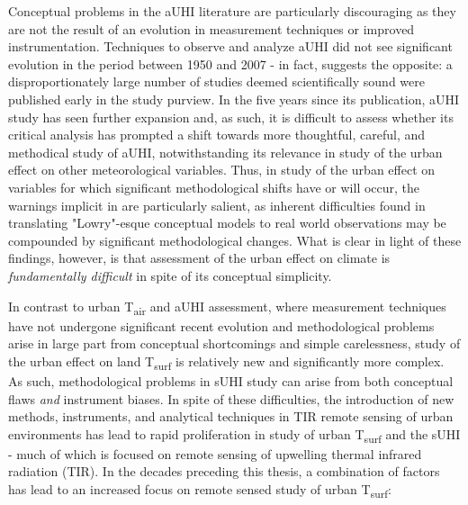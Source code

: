 \begin{bibunit}
Conceptual problems in the aUHI literature are particularly discouraging as they are not the result of an evolution in measurement techniques or improved instrumentation. Techniques to observe and analyze aUHI did not see significant evolution in the period between 1950 and 2007 - in fact, \citet{Stewart2011} suggests the opposite: a disproportionately large number of studies deemed scientifically sound were published early in the study purview. In the five years since its publication, aUHI study has seen further expansion and, as such, it is difficult to assess whether its critical analysis has prompted a shift towards more thoughtful, careful, and methodical study of aUHI, notwithstanding its relevance in study of the urban effect on other meteorological variables. Thus, in study of the urban effect on variables for which significant methodological shifts have or will occur, the warnings implicit in \citet{Stewart2011} are particularly salient, as inherent difficulties found in translating "Lowry"-esque conceptual models to real world observations may be compounded by significant methodological changes. What is clear in light of these findings, however, is that assessment of the urban effect on climate is \textit{fundamentally difficult} in spite of its conceptual simplicity. 


In contrast to urban T\textsubscript{air} and aUHI assessment, where measurement techniques have not undergone significant recent evolution and methodological problems arise in large part from conceptual shortcomings and simple carelessness, study of the urban effect on land T\textsubscript{surf} is relatively new and significantly more complex. As such, methodological problems in sUHI study can arise from both conceptual flaws \textit{and} instrument biases. In spite of these difficulties, the introduction of new methods, instruments, and analytical techniques in TIR remote sensing of urban environments has lead to rapid proliferation in study of urban T\textsubscript{surf} and the sUHI - much of which is focused on remote sensing of upwelling thermal infrared radiation (TIR). In the decades preceding this thesis, a combination of factors has lead to an increased focus on remote sensed study of urban T\textsubscript{surf}: 


\end{bibunit}
